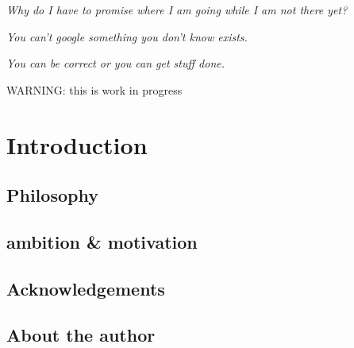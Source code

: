 \documentclass[a4paper]{article}
\numberwithin{equation}{section}
\begin{document}

\vspace{7cm}

\begin{center}
{\sl Why do I have to promise where I am going while I am not there yet?}

\vspace{1cm}

{\sl You can't google something you don't know exists.}

\vspace{1cm}

{\sl You can be correct or you can get stuff done.}
\end{center}





\newpage
\maketitle
\tableofcontents
\newpage
\begin{center}
{\color{red} \huge WARNING: this is work in progress}
\end{center}

\section{Introduction} %
\subsection{Philosophy}  %
\subsection{ambition \& motivation}  %
\subsection{Acknowledgements}  %
\subsection{About the author}  %
\end{document}
